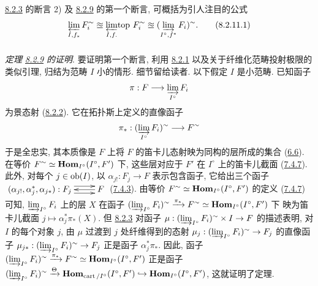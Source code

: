 \subsubsection{}

\hyperref[VI.thm8.2.3]{8.2.3} 的断言 2)
及 \hyperref[VI.thm8.2.9]{8.2.9} 的第一个断言,
可概括为引人注目的公式
\begin{equation*}
\varprojlim_{I, f_{\ast}}F_i^{\sim} \approxeq
{\displaystyle{\varprojlim_{I, f.}\!\mbox{\rm top }}} F_i^{\sim} \approxeq
(\varinjlim_{I^{\circ}, f^{\ast}} F_i)^{\sim}{}. \tag{8.2.11.1}
\end{equation*}

\subsubsection{}
\emph{定理 \hyperref[VI.thm8.2.9]{8.2.9} 的证明}.
要证明第一个断言,
利用 \hyperref[VI.lem8.2.1]{8.2.1}
以及关于纤维化范畴投射极限的类似引理,
归结为范畴 $I$ 小的情形.
细节留给读者.
以下假定 $I$ 是小范畴.
已知函子
$$
\pi : F \to \varinjlim_{I^{\circ}} F_i
$$
为景态射 (\hyperref[VI.lem8.2.2]{8.2.2}).
它在拓扑斯上定义的\pageoriginale{}直像函子
$$
\pi_{\ast} : (\varinjlim_{I^{\circ}} F_i)^{\sim} \to F^{\sim}
$$
于是全忠实,
其本质像是 $F$ 上将 $F$ 的笛卡儿态射映为同构的层所成的集合
(\hyperref[VI.exe6.6]{6.6}).
在等价 $F^{\sim}\simeq\operatorname{\mathbf{Hom}}_{I^{\circ}}(I^{\circ},F')$ 下,
这些层对应于 $F'$ 在 $I^{\circ}$ 上的笛卡儿截面
(\hyperref[VI.prop7.4.7]{7.4.7}).
此外, 对每个 $j\in\operatorname{ob}(I)$,
以 $\alpha_{j!}:F_j\to F$ 表示包含函子,
它给出三个函子
$\xymatrix{(\alpha_{j!},\alpha^{\ast}_j,\alpha_{j\ast}):F_j
\ar@<4pt>[r]\ar@<-4pt>[r]&F\ar[l]}$
(\hyperref[VI.rem7.4.3]{7.4.3}).
由等价 $F^{\sim}\simeq\operatorname{\mathbf{Hom}}_{I^{\circ}}(I^{\circ},F')$ 的定义
(\hyperref[VI.prop7.4.7]{7.4.7}) 可知,
$\varinjlim_{I^{\circ}}F_i$ 上的层 $X$
在函子
$(\varinjlim_{I^{\circ}}F_i)^{\sim}\xrightarrow{\pi_{\ast}}F^{\sim}
\simeq\operatorname{\mathbf{Hom}}_{I^{\circ}}(I^{\circ},F')$ 下
映为笛卡儿截面 $j\mapsto\alpha^{\ast}_j\pi_{\ast}(X)$.
但 \hyperref[VI.thm8.2.3]{8.2.3} 对函子
$\mu:(\varinjlim_{I^{\circ}}F_i)^{\sim}\times I\to F$ 的描述表明,
对 $I$ 的每个对象 $j$,
由 $\mu$ 过渡到 $j$ 处纤维得到的态射
$\mu_j:(\varinjlim_{I^{\circ}}F_i)^{\sim}\to F_j$
的直像函子
$\mu_{j\ast}:(\varinjlim_{I^{\circ}}F_i)^{\sim}\to F_j$
正是函子 $\alpha^{\ast}_j\pi_{\ast}$.
因此, 函子
$(\varinjlim_{I^{\circ}}F_i)^{\sim}\xrightarrow{\pi_{\ast}}F^{\sim}
\simeq\operatorname{\mathbf{Hom}}_{I^{\circ}}(I^{\circ},F')$
正是函子
$(\varinjlim_{I^{\circ}}F_i)^{\sim}\xrightarrow{\Theta}
\operatorname{\mathbf{Hom}}_{\operatorname{cart}/I^{\circ}}(I^{\circ},F')\hookrightarrow
\operatorname{\mathbf{Hom}}_{I^{\circ}}(I^{\circ},F')$,
这就证明了定理.


